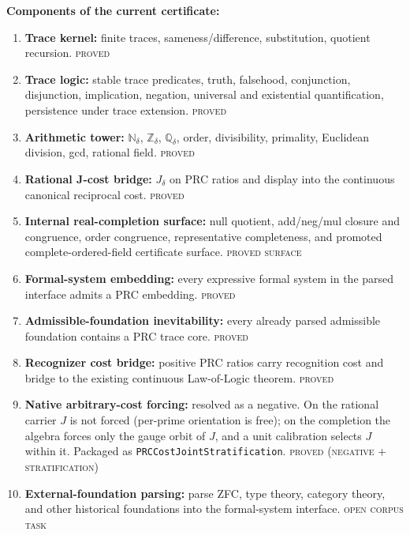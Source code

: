 \documentclass[11pt,a4paper]{article}
\theoremstyle{definition}
\theoremstyle{remark}
\begin{document}
\medskip
\noindent\textbf{Components of the current certificate:}
\begin{enumerate}[leftmargin=2em, label=\textup{(C\arabic*)}]
  \item \textbf{Trace kernel:} finite traces, sameness/difference,
    substitution, quotient recursion. \hfill \textsc{proved}
  \item \textbf{Trace logic:} stable trace predicates, truth, falsehood,
    conjunction, disjunction, implication, negation, universal and existential
    quantification, persistence under trace extension. \hfill \textsc{proved}
  \item \textbf{Arithmetic tower:} $\mathbb{N}_\delta$, $\mathbb{Z}_\delta$,
    $\mathbb{Q}_\delta$, order, divisibility, primality, Euclidean division,
    gcd, rational field. \hfill \textsc{proved}
  \item \textbf{Rational J-cost bridge:} $J_\delta$ on PRC ratios and display
    into the continuous canonical reciprocal cost. \hfill \textsc{proved}
  \item \textbf{Internal real-completion surface:} null quotient, add/neg/mul
    closure and congruence, order congruence, representative completeness, and
    promoted complete-ordered-field certificate surface. \hfill
    \textsc{proved surface}
  \item \textbf{Formal-system embedding:} every expressive formal system in
    the parsed interface admits a PRC embedding. \hfill \textsc{proved}
  \item \textbf{Admissible-foundation inevitability:} every already parsed
    admissible foundation contains a PRC trace core. \hfill \textsc{proved}
  \item \textbf{Recognizer cost bridge:} positive PRC ratios carry recognition
    cost and bridge to the existing continuous Law-of-Logic theorem. \hfill
    \textsc{proved}
  \item \textbf{Native arbitrary-cost forcing:} resolved as a negative. On the
    rational carrier $J$ is not forced (per-prime orientation is free); on the
    completion the algebra forces only the gauge orbit of $J$, and a unit
    calibration selects $J$ within it. Packaged as
    \texttt{PRCCostJointStratification}. \hfill \textsc{proved (negative + stratification)}
  \item \textbf{External-foundation parsing:} parse ZFC, type theory, category
    theory, and other historical foundations into the formal-system interface.
    \hfill \textsc{open corpus task}
\end{enumerate}
\end{document}
